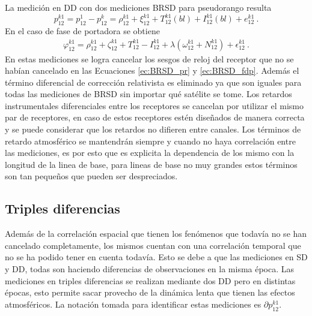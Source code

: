 \documentclass[a4paper,12pt,oneside,onecolumn,final,openright]{book}%
\begin{document}
	La medición en DD con dos mediciones BRSD para pseudorango resulta
\begin{equation}\label{ec:DD_pr}
	p_{12}^{k1} = p_{12}^1 - p_{12}^k = \rho_{12}^{k1} + \xi_{12}^{k1} + T_{12}^{k1}(bl) + I_{12}^{k1}(bl) + e_{12}^{k1} \ .
\end{equation}
	En el caso de fase de portadora se obtiene
\begin{align}\label{ec:DD_fdp}
	\varphi_{12}^{k1} = \rho_{12}^{k1} + \zeta_{12}^{k1} + T_{12}^{k1} - I_{12}^{k1}	+\lambda \left( \omega_{12}^{k1} + N_{12}^{k1}\right) + \epsilon_{12}^{k1} \ .
\end{align}
	En estas mediciones se logra cancelar los sesgos de reloj del receptor que no se habían cancelado en las Ecuaciones \ref{ec:BRSD_pr} y \ref{ec:BRSD_fdp}. Además el término diferencial de corrección relativista es eliminado ya que son iguales para todas las mediciones de BRSD sin importar qué satélite se tome. Los retardos instrumentales diferenciales entre los receptores se cancelan por utilizar el mismo par de receptores, en caso de estos receptores estén diseñados de manera correcta y se puede considerar que los retardos no difieren entre canales. Los términos de retardo atmosférico se mantendrán siempre y cuando no haya correlación entre las mediciones, es por esto que es explicita la dependencia de los mismo con la longitud de la linea de base, para lineas de base no muy grandes estos términos son tan pequeños que pueden ser despreciados.

\subsection{Triples diferencias}
	Además de la correlación espacial que tienen los fenómenos que todavía no se han cancelado completamente, los mismos cuentan con una correlación temporal que no se ha podido tener en cuenta todavía. Esto se debe a que las mediciones en SD y DD, todas son haciendo diferencias de observaciones en la misma época. Las mediciones en triples diferencias se realizan mediante dos DD pero en distintas épocas, esto permite sacar provecho de la dinámica lenta que tienen las efectos atmosféricos. La notación tomada para identificar estas mediciones es $\partial p_{12}^{k1}$.
	
\end{document}
